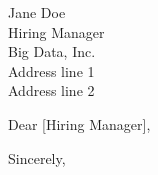 \documentclass[10pt,letter]{letter}
\def\hm{Jane Doe} %
\begin{document}
\begin{letter}{\hm \\ Hiring Manager \\ Big Data, Inc. \\ Address line 1 \\ Address line 2  }

\opening{Dear [Hiring Manager],}

\setlength\parindent{.5in}



 

\closing{Sincerely,}
\end{letter}
\end{document}
